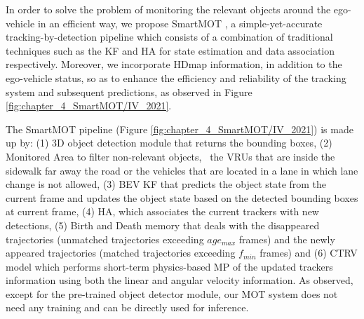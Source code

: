In order to solve the problem of monitoring the relevant objects around the ego-vehicle in an efficient way, we propose SmartMOT \cite{gomez2021smartmot}, a simple-yet-accurate tracking-by-detection pipeline which consists of a combination of traditional techniques such as the \ac{KF} \cite{kalman1960new} and \ac{HA} \cite{kuhn1955hungarian} for state estimation and data association respectively. Moreover, we incorporate \ac{HDmap} information, in addition to the ego-vehicle status, so as to enhance the efficiency and reliability of the tracking system and subsequent predictions, as observed in Figure \ref{fig:chapter_4_SmartMOT/IV_2021}. 

The SmartMOT pipeline (Figure \ref{fig:chapter_4_SmartMOT/IV_2021}) is made up by: (1) 3D object detection module that returns the bounding boxes, (2) Monitored Area to filter non-relevant objects, \eg \ the \acfp{VRU} that are inside the sidewalk far away the road or the vehicles that are located in a lane in which lane change is not allowed, (3) \acf{BEV} \acf{KF} that predicts the object state from the current frame and updates the object state based on the detected bounding boxes at current frame, (4) \acf{HA}, which associates the current trackers with new detections, (5) Birth and Death memory that deals with the disappeared trajectories (unmatched trajectories exceeding ${age_{max}}$ frames) and the newly appeared trajectories (matched trajectories exceeding ${f_{min}}$ frames) and (6) \ac{CTRV} model which performs short-term physics-based \ac{MP} of the updated trackers information using both the linear and angular velocity information. As observed, except for the pre-trained object detector module, our \ac{MOT} system does not need any training and can be directly used for inference.

